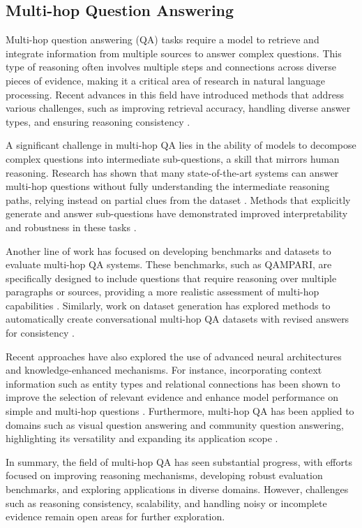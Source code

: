 \subsection{Multi-hop Question Answering}

Multi-hop question answering (QA) tasks require a model to retrieve and integrate information from multiple sources to answer complex questions. This type of reasoning often involves multiple steps and connections across diverse pieces of evidence, making it a critical area of research in natural language processing. Recent advances in this field have introduced methods that address various challenges, such as improving retrieval accuracy, handling diverse answer types, and ensuring reasoning consistency \cite{balepur2024reverse,amouyal2022qampari}.

A significant challenge in multi-hop QA lies in the ability of models to decompose complex questions into intermediate sub-questions, a skill that mirrors human reasoning. Research has shown that many state-of-the-art systems can answer multi-hop questions without fully understanding the intermediate reasoning paths, relying instead on partial clues from the dataset \cite{tang2020subquestions}. Methods that explicitly generate and answer sub-questions have demonstrated improved interpretability and robustness in these tasks \cite{wang2022covqa}.

Another line of work has focused on developing benchmarks and datasets to evaluate multi-hop QA systems. These benchmarks, such as QAMPARI, are specifically designed to include questions that require reasoning over multiple paragraphs or sources, providing a more realistic assessment of multi-hop capabilities \cite{amouyal2022qampari}. Similarly, work on dataset generation has explored methods to automatically create conversational multi-hop QA datasets with revised answers for consistency \cite{hwang2022conversational}.

Recent approaches have also explored the use of advanced neural architectures and knowledge-enhanced mechanisms. For instance, incorporating context information such as entity types and relational connections has been shown to improve the selection of relevant evidence and enhance model performance on simple and multi-hop questions \cite{chao2018context}. Furthermore, multi-hop QA has been applied to domains such as visual question answering and community question answering, highlighting its versatility and expanding its application scope \cite{hu2023qan,zhang2020product}.

In summary, the field of multi-hop QA has seen substantial progress, with efforts focused on improving reasoning mechanisms, developing robust evaluation benchmarks, and exploring applications in diverse domains. However, challenges such as reasoning consistency, scalability, and handling noisy or incomplete evidence remain open areas for further exploration.